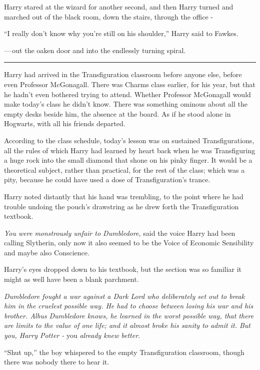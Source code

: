 Harry stared at the wizard for another second, and then Harry turned and marched out of the black room, down the stairs, through the office -

``I really don't know why you're still on his shoulder,'' Harry said to Fawkes.

---\,out the oaken door and into the endlessly turning spiral.

\begin{center}\rule{3in}{0.4pt}\end{center}

Harry had arrived in the Transfiguration classroom before anyone else, before even Professor McGonagall. There was Charms class earlier, for his year, but that he hadn't even bothered trying to attend. Whether Professor McGonagall would make today's class he didn't know. There was something ominous about all the empty desks beside him, the absence at the board. As if he stood alone in Hogwarts, with all his friends departed.

According to the class schedule, today's lesson was on sustained Transfigurations, all the rules of which Harry had learned by heart back when he was Transfiguring a huge rock into the small diamond that shone on his pinky finger. It would be a theoretical subject, rather than practical, for the rest of the class; which was a pity, because he could have used a dose of Transfiguration's trance.

Harry noted distantly that his hand was trembling, to the point where he had trouble undoing the pouch's drawstring as he drew forth the Transfiguration textbook.

\emph{You were monstrously unfair to Dumbledore,} said the voice Harry had been calling Slytherin, only now it also seemed to be the Voice of Economic Sensibility and maybe also Conscience.

Harry's eyes dropped down to his textbook, but the section was so familiar it might as well have been a blank parchment.

\emph{Dumbledore fought a war against a Dark Lord who deliberately set out to break him in the cruelest possible way. He had to choose between losing his war and his brother. Albus Dumbledore knows, he learned in the worst possible way, that there are limits to the value of one life; and it almost broke his sanity to admit it. But you, Harry Potter -} you \emph{already knew better.}

``Shut up,'' the boy whispered to the empty Transfiguration classroom, though there was nobody there to hear it.

